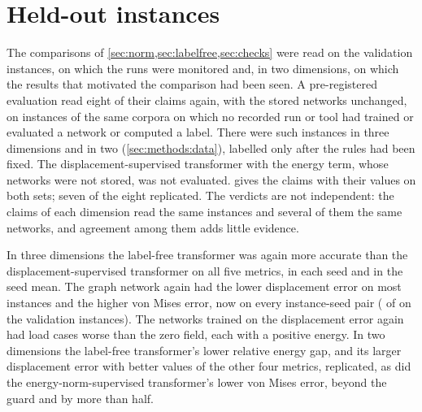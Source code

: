 \section{Held-out instances}\label{sec:holdout}



The comparisons of \cref{sec:norm,sec:labelfree,sec:checks} were read on the validation
instances, on which the runs were monitored and, in two dimensions, on which the results
that motivated the comparison had been seen. A pre-registered evaluation read eight of their
claims again, with the stored networks unchanged, on instances of the same corpora on which
no recorded run or tool had trained or evaluated a network or computed a label. There were \numHoldThreeN{} such instances in three dimensions and
\numHoldTwoN{} in two
(\cref{sec:methods:data}), labelled only after the rules had been fixed. The
displacement-supervised transformer with the energy term, whose networks were not stored,
was not evaluated.  gives the claims with their values on both sets; seven
of the eight replicated. The verdicts are not independent: the claims of each dimension read
the same instances and several of them the same networks, and agreement among them adds
little evidence.

In three dimensions the label-free transformer was again more accurate than the
displacement-supervised transformer on all five metrics, in each seed and in the seed mean. The graph network again had the lower displacement error on
most instances and the higher von Mises error, now on every instance-seed pair
(\numMgnVmHigher{} of \numThreePairs{} on the validation instances). The networks trained on the displacement error again had load
cases worse than the zero field, each with a positive energy. In two dimensions the
label-free transformer's lower relative energy gap, and its larger displacement error with
better values of the other four metrics, replicated, as did the energy-norm-supervised
transformer's lower von Mises error, beyond the guard and by more than half.

